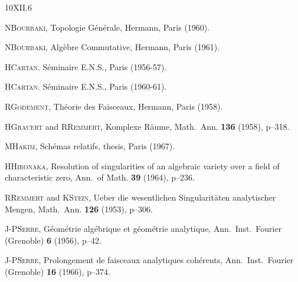 \begin{thebibliography}{10}{XII.6}

 N\ptbl \textsc{Bourbaki},
Topologie G\'en\'erale, Hermann, Paris (1960).

 N\ptbl \textsc{Bourbaki},
Alg\`ebre Commutative, Hermann, Paris (1961).

 H\ptbl \textsc{Cartan}. S\'eminaire E.N.S., Paris (1956-57).

 H\ptbl \textsc{Cartan}. S\'eminaire E.N.S., Paris (1960-61).

 R\ptbl \textsc{Godement}, Th\'eorie des Faisceaux, Hermann, Paris
(1958).

 H\ptbl \textsc{Grauert} and R\ptbl \textsc{Remmert},
Komplexe R\"aume, Math.\ Ann. \textbf{136} (1958), p--318.

 M\ptbl \textsc{Hakim}, Sch\'emas relatifs, thesis, Paris (1967).

 H\ptbl \textsc{Hironaka},
Resolution of singularities of an algebraic variety over a field of characteristic zero, Ann.\ of Math. \textbf{39} (1964), p--236.

 R\ptbl \textsc{Remmert} and K\ptbl \textsc{Stein},
Ueber die wesentlichen Singularit\"aten analytischer Mengen,
Math.\ Ann. \textbf{126} (1953), p--306.

J-P\ptbl\textsc{Serre},
G\'eom\'etrie alg\'ebrique et g\'eom\'etrie analytique, Ann.\ Inst.\ Fourier (Grenoble) \textbf{6} (1956), p--42.

J-P\ptbl\textsc{Serre},
Prolongement de faisceaux analytiques
coh\'erents, Ann.\ Inst.\ Fourier (Grenoble) \textbf{16} (1966), p--374.

\end{thebibliography}

